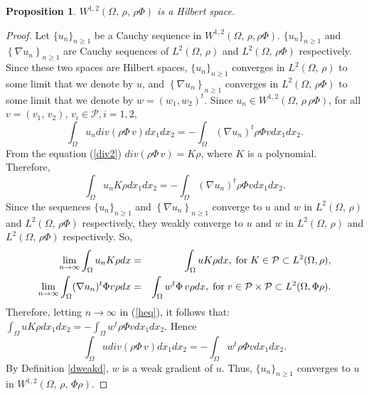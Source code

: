 \documentclass[11pt]{article}
\newtheorem{proposition}[theorem]{Proposition}
\begin{document}
	\begin{proposition} $W^{1,2}(\Omega,\,\rho,\,\rho\Phi)$ is a Hilbert space.
	\end{proposition}
	\begin{proof}
		Let $\{u_n\}_{n \geq 1}$ be a Cauchy sequence in $ W^{1,2}(\Omega,\,  \rho, \rho \Phi)$.  $\{u_n\}_{n \geq 1}$  and $\left\{\nabla u_n  \right\}_{n \geq 1}$ are Cauchy sequences of $L^2(\Omega,\,  \rho)$ and $L^2(\Omega,\,  \rho \Phi)$ respectively. Since these two spaces are Hilbert spaces,  $\{u_n\}_{n \geq 1}$ converges in $L^2(\Omega,\,  \rho)$ to some limit that we denote by $u$, and $\left\{ \nabla u_n  \right\}_{n \geq 1}$ converges in $L^2(\Omega,\,  \rho \Phi)$ to some limit that we denote by $w= (w_1, w_2)^t$. Since $u_n\in W^{1,2}(\Omega,\,\rho\,\rho\Phi)$, for all $v=(v_1,\,v_2)$, $v_i\in \mathcal{P},i=1,2,$
		\begin{equation*}
			\int_{\Omega}u_ndiv(\rho\Phi\,v)dx_1dx_2=-\int_{\Omega}\left(\nabla u_n\right)^t\rho\Phi v dx_1dx_2.
		\end{equation*}
		From the equation (\ref{div2}) $div(\rho\Phi\,v)=K\rho$, where $K$ is a polynomial. Therefore, 
		\begin{equation}\label{heq}
			\int_{\Omega}u_nK\rho dx_1dx_2=-\int_{\Omega}\left(\nabla u_n\right)^t\rho\Phi v dx_1dx_2.
		\end{equation}
		Since the sequences $\{u_n\}_{n\geq 1}$ and $\left\{ \nabla u_n  \right\}_{n \geq 1}$ converge to $u$ and $w$  in $L^2(\Omega,\,\rho)$ and $L^2(\Omega,\,  \rho \Phi)$ respectively, they weakly converge to $u$ and $w$ in $L^2(\Omega,\,\rho)$ and $L^2(\Omega,\,  \rho \Phi)$ respectively. So,
		\begin{eqnarray*}
			\lim_{n \to \infty}\int_{{\Omega}}u_nK\rho dx&=&\int_{{\Omega}}uK\rho dx,\;{\rm for}\;K\in\mathcal{P}\subset L^2(\Omega,\rho),\\
				\lim_{n \to \infty}\int_{{\Omega}}(\nabla u_n)^t\Phi v\rho dx&=&\int_{{\Omega}}w^t\Phi\,v\rho dx,\;{\rm for}\;v\in\mathcal{P}\times \mathcal{P}\subset L^2(\Omega,\Phi\rho).
		\end{eqnarray*}
		 Therefore,
		letting $n\to \infty$ in  (\ref{heq}), it follows that: 	$\int_{\Omega}u K\rho dx_1dx_2=-\int_{\Omega}w^t\rho\Phi v dx_1dx_2.$ Hence	$$\int_{\Omega}udiv(\rho\Phi\,v)  dx_1dx_2=-\int_{\Omega}w^t\rho\Phi v dx_1dx_2.$$ By Definition \ref{dweakd}, $w$ is a weak gradient of $u$. Thus, $\{u_n\}_{n \geq 1}$ converges to $u$ in $W^{1,2}\left(\Omega,\,\rho,\,\Phi\rho\right)$.
	\end{proof}
	
\end{document}
